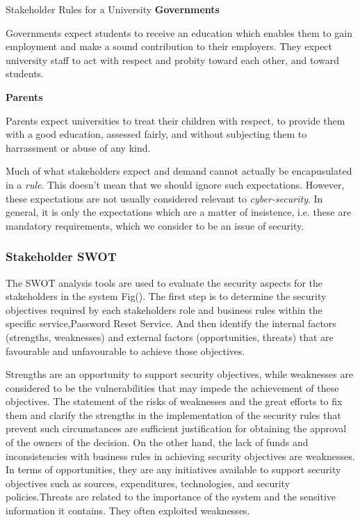 \begin{example}{Stakeholder Rules for a University}
{\bf Governments}

Governments expect students to receive an education which enables them to gain employment and
make a sound contribution to their employers. They expect university staff to act with respect and
probity toward each other, and toward students.

{\bf Parents}

Parents expect universities to treat their children with respect, to provide them with 
a good education, assessed fairly, and without subjecting them to harrassment or
abuse of any kind.

\end{example}

Much of what stakeholders expect and demand cannot actually be encapusulated in a {\em rule}.
This doesn't mean that we should ignore such expectations. However, these expectations
are not usually considered relevant to {\em cyber-security}. In general, it is only
the expectations which are a matter of insistence, i.e. these are mandatory requirements,
which we consider to be an issue of security.


\iffalse
\subsubsection{Stakeholder SWOT}\label{stswot}
The SWOT analysis tools are used to evaluate the security aspects for the stakeholders in the system Fig(). The first step is to determine the security objectives required by each stakeholders role and business rules within the specific service,Password Reset Service. And then identify the internal factors (strengths, weaknesses) and external factors (opportunities, threats) that are favourable and unfavourable to achieve those objectives.

Strengths are an opportunity to support security objectives, while weaknesses are considered to be the vulnerabilities that may impede the achievement of these objectives. The statement of the risks of weaknesses and the great efforts to fix them and clarify the strengths in the implementation of the security rules that prevent such circumstances are sufficient justification for obtaining the approval of the owners of the decision. On the other hand, the lack of funds and inconsistencies with business rules in achieving security objectives are weaknesses. In terms of opportunities, they are any initiatives available to support security objectives such as sources, expenditures, technologies, and security policies.Threats are related to the importance of the system and the sensitive information it contains. They often exploited weaknesses.


